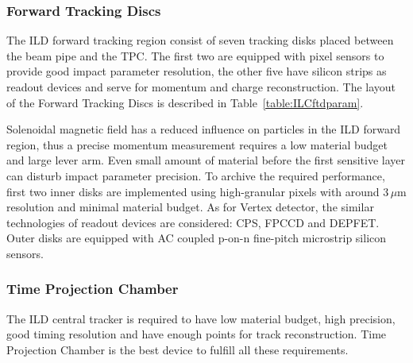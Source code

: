 
\subsubsection{Forward Tracking Discs}

The ILD forward tracking region consist of seven tracking disks  placed between the beam pipe and the TPC. The first two are equipped with pixel sensors to provide good impact parameter resolution, the other five have silicon strips as readout devices and serve for momentum and charge reconstruction. The layout of the Forward Tracking Discs is described in Table~\ref{table:ILCftdparam}. 



Solenoidal magnetic field has a reduced influence on particles in the ILD forward region, thus a precise momentum measurement requires a low material budget and large lever arm. Even small amount of material before the first sensitive layer can disturb impact parameter precision. To archive the required performance, first two inner disks are implemented using high-granular pixels with around 3\,$\mu$m resolution and minimal material budget. As for Vertex detector, the similar technologies of readout devices are considered: CPS, FPCCD and DEPFET. Outer disks are equipped with AC coupled p-on-n fine-pitch microstrip silicon sensors.

\subsubsection{Time Projection Chamber}

The ILD central tracker is required to have low material budget, high precision, good timing resolution and have enough points for track reconstruction. Time Projection Chamber is the best device to fulfill all these requirements. 

